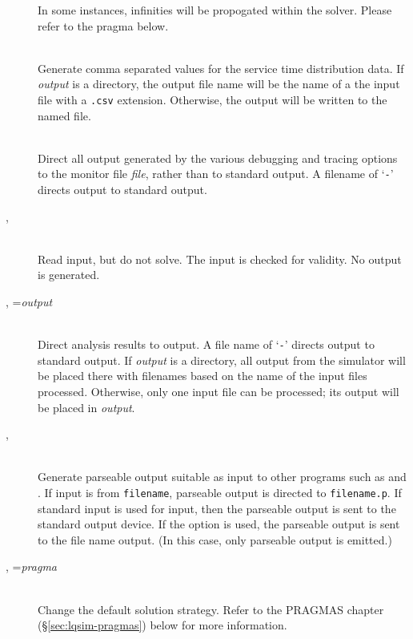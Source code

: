 \begin{description}
  In some instances,
  infinities will be
  propogated within the solver.  Please refer to the
   pragma below.
\item[\flag{h}{output}]~\\
  Generate comma separated values for the service time distribution
  data.  If \emph{output} is a directory, the output file name will be the
  name of a the input file with a \texttt{.csv} extension.  Otherwise, the output will be
  written to the named file.
\item[\flag{m}{file}]~\\
  Direct all output generated by the various
  debugging and tracing options
  to the monitor file \emph{file}, rather than to
  standard output.  A filename of `\texttt{-}' directs output to
  standard output.
\item[\flag{n}{}, \longopt{no-execute}]~\\
  Read input, but do not solve.  The input is checked for validity. No
  output is generated.
\item[\flag{o}{}, \longopt{output}=\emph{output}]~\\
  Direct analysis results to output.  A file name of `\texttt{-}' directs output to standard
  output.  If \emph{output} is a directory, all output from the simulator will be placed there with
  filenames based on the name of the input files processed.  Otherwise, only one input file can be
  processed; its output will be placed in \emph{output}.
\item[\flag{p}{}, \longopt{parseable}]~\\
  Generate parseable output suitable as input
  to other programs such as  and
  .  If input is from \texttt{filename},
  parseable output is directed to \texttt{filename.p}.  If standard
  input is used for input, then the parseable
  output is sent to the standard output device.  If the
   option is used, the parseable output is sent to the
  file name output.  (In this case, only parseable output is emitted.)
\item[\flag{P}, \longopt{pragma}=\emph{pragma}]~\\
  Change the default solution strategy.  Refer to the PRAGMAS chapter
  (\S\ref{sec:lqsim-pragmas}) below for more information.

\end{description}
